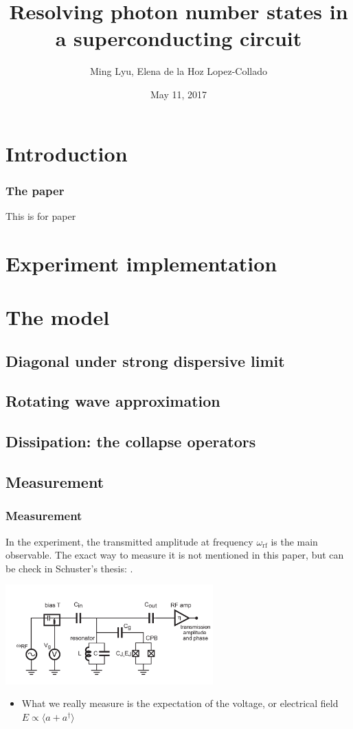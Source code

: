 \documentclass[12pt,hyperref={CJKbookmarks=true}]{beamer}
\title[Nature 445, 515-518]{Resolving photon number states in a superconducting circuit}
\author[Ming, Elena]{Ming Lyu, Elena de la Hoz Lopez-Collado}
\institute[Princeton]{Final projects for ELE456 at Princeton}
\date{May 11, 2017}
\newcommand{\rf}{\text{rf}}
\begin{document}
\begin{frame}
\titlepage
\end{frame}
\begin{frame}
    \tableofcontents
\end{frame}

\section{Introduction} 
\begin{frame}[t]\frametitle{The paper}
    
This is for paper \cite{schuster2007resolving} %

\end{frame}

\section{Experiment implementation}

\section{The model}
\subsection{Diagonal under strong dispersive limit}
\subsection{Rotating wave approximation}
\subsection{Dissipation: the collapse operators}
\subsection{Measurement}
\begin{frame}[t]\frametitle{Measurement}
In the experiment, the transmitted amplitude at frequency $\omega_{\rf}$ is the main observable. The exact way to measure it is not mentioned in this paper, 
but can be check in Schuster's thesis: \cite{schuster2007circuit}. 
\begin{center}
  \includegraphics[width=0.6\textwidth]{measurement.png}
\end{center}
	\begin{itemize}
		\item What we really measure is the expectation of the voltage, or 
		electrical field $E\propto\langle a + a^\dag \rangle$
	\end{itemize}

\end{frame}
\end{document}
